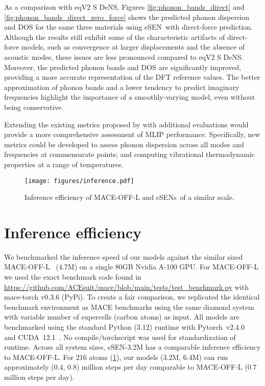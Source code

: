 \documentclass[twocolumn]{fairmeta}
\newcommand{\ourmodel}{eSEN}
\begin{document}
As a comparison with eqV2 S DeNS, Figures \cref{fig:phonon_bands_direct} and \cref{fig:phonon_bands_direct_zero_force} shows the predicted phonon dispersion and DOS for the same three materials using \ourmodel\ with direct-force prediction. Although the results still exhibit some of the characteristic artifacts of direct-force models, such as convergence at larger displacements and the absence of acoustic modes, these issues are less pronounced compared to eqV2 S DeNS. Moreover, the predicted phonon bands and DOS are significantly improved, providing a more accurate representation of the DFT reference values. The better approximation of phonon bands and a lower tendency to predict imaginary frequencies highlight the importance of a smoothly-varying model, even without being conservative.

Extending the existing metrics proposed by \citealt{loew2024universal} with additional evaluations would provide a more comprehensive assessment of MLIP performance. Specifically, new metrics could be developed to assess phonon dispersion across all modes and frequencies at commensurate points; and computing vibrational thermodynamic properties at a range of temperatures.

\begin{figure}[h]
\centering
\texttt{[image: figures/inference.pdf]}
\caption{Inference efficiency of MACE-OFF-L and \ourmodel s\ of a similar scale.}
\label{fig:inference}
\end{figure}

\section{Inference efficiency}
\label{appendix:inference}


We benchmarked the inference speed of our models against the similar sized MACE-OFF-L~\citep{kovacs2023mace} (4.7M) on a single 80GB Nvidia A-100 GPU. For MACE-OFF-L we used the exact benchmark code found in \url{https://github.com/ACEsuit/mace/blob/main/tests/test_benchmark.py}
 with mace-torch v0.3.6 (PyPi). To create a fair comparison, we replicated the identical benchmark environment as MACE benchmarks using the same diamond system with variable number of supercells (carbon atoms) as input. All models are benchmarked using the standard Python (3.12) runtime with Pytorch~v2.4.0~\citep{paszke2019pytorch} and CUDA~12.1~\citep{nickolls2008scalable}. No compile/torchscript was used for standardization of runtime. Across all system sizes, \ourmodel-3.2M has a comparable inference efficiency to MACE-OFF-L. For 216 atoms (\cref{fig:inference}), our models (3.2M, 6.4M) can run approximately (0.4, 0.8) million steps per day comparable to MACE-OFF-L (0.7 million steps per day).
\end{document}

